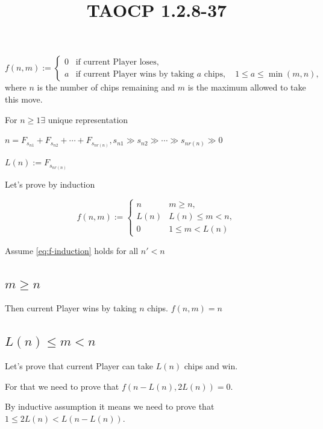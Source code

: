\documentclass{article}
\title{TAOCP 1.2.8\mbox{-}37}
\begin{document}
\maketitle

\begin{equation*}
  f(n, m) := \begin{cases}
    0 & \text{if current Player loses}, \\
    a & \text{if current Player wins by taking } a \text{ chips},\quad 1 \leq a \leq \min(m, n),
  \end{cases}
\end{equation*}
where \( n \) is the number of chips remaining and \( m \) is the maximum allowed to take this move.


For \( n \geq 1 \exists \) unique representation

\( n = F_{s_{n1}} + F_{s_{n2}} + \cdots + F_{s_{nr(n)}}, s_{n1} \gg s_{n2} \gg \cdots \gg s_{nr(n)} \gg 0 \)

\( L(n) := F_{s_{nr(n)}} \)

Let's prove by induction

\begin{equation}\label{eq:f-induction}
  f(n, m) := \begin{cases}
    n & m \geq n, \\
    L(n) & L(n) \leq m < n, \\
    0 & 1 \leq m < L(n)
  \end{cases}
\end{equation}

Assume \eqref{eq:f-induction} holds for all \( n' < n \)

\subsection*{\( m \geq n \)}

Then current Player wins by taking \( n \) chips. \( f(n, m) = n \)

\subsection*{\( L(n) \leq m < n \) }

Let's prove that current Player can take \( L(n) \) chips and win.

For that we need to prove that \( f(n - L(n), 2L(n)) = 0 \).

By inductive assumption it means we need to prove that \( 1 \leq 2L(n) < L(n - L(n)) \).
\end{document}
